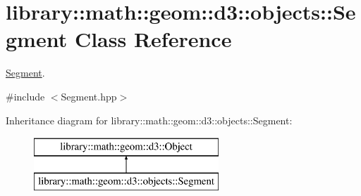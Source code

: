 \hypertarget{classlibrary_1_1math_1_1geom_1_1d3_1_1objects_1_1_segment}{}\section{library\+:\+:math\+:\+:geom\+:\+:d3\+:\+:objects\+:\+:Segment Class Reference}
\label{classlibrary_1_1math_1_1geom_1_1d3_1_1objects_1_1_segment}


\hyperlink{classlibrary_1_1math_1_1geom_1_1d3_1_1objects_1_1_segment}{Segment}.  




{\ttfamily \#include $<$Segment.\+hpp$>$}

Inheritance diagram for library\+:\+:math\+:\+:geom\+:\+:d3\+:\+:objects\+:\+:Segment\+:\begin{figure}[H]
\begin{center}
\leavevmode
\includegraphics[height=2.000000cm]{classlibrary_1_1math_1_1geom_1_1d3_1_1objects_1_1_segment}
\end{center}
\end{figure}
